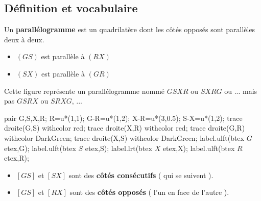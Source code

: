 \begin{changemargin}{0mm}{-15mm}
    \section{Définition et vocabulaire}
    \begin{definition}
        Un \textbf{parallélogramme} est un quadrilatère dont les côtés opposés sont parallèles deux à deux.
    \end{definition}
    \begin{exemple*1}
        \phantom{rrr}    

        \begin{minipage}{0.6\linewidth}
            \begin{itemize}
                \item $(GS)$ est parallèle à $(RX)$
                \item $(SX)$ est parallèle à $(GR)$
            \end{itemize}
            Cette figure représente un parallélogramme nommé $GSXR$ ou $SXRG$ ou ... mais pas $GSRX$ ou $SRXG$, ...
        \end{minipage}
        \begin{minipage}{0.4\linewidth}
            \begin{Geometrie}[CoinBG={(0.5u,0.5u)},CoinHD={(5.5u,4u)}]
                pair G,S,X,R;
                R=u*(1,1);
                G-R=u*(1,2);
                X-R=u*(3,0.5);
                S-X=u*(1,2);                
                trace droite(G,S) withcolor red;
                trace droite(X,R) withcolor red;
                trace droite(G,R) withcolor DarkGreen;
                trace droite(X,S) withcolor DarkGreen;
                label.ulft(btex $G$ etex,G);
                label.ulft(btex $S$ etex,S);
                label.lrt(btex $X$ etex,X);
                label.ulft(btex $R$ etex,R);
            \end{Geometrie}
        \end{minipage}
        \vspace*{-10mm}
    \end{exemple*1}
    \begin{definition}[Vocabulaire]
        \begin{itemize}
            \item $[GS]$ et $[SX]$ sont des \colorbox{red!30}{\textbf{côtés consécutifs}} ( qui se suivent ).
            \item $[GS]$ et $[RX]$ sont des \colorbox{red!30}{\textbf{côtés opposés}} ( l'un en face de l'autre ).

\end{itemize}
\end{definition}
\end{changemargin}
